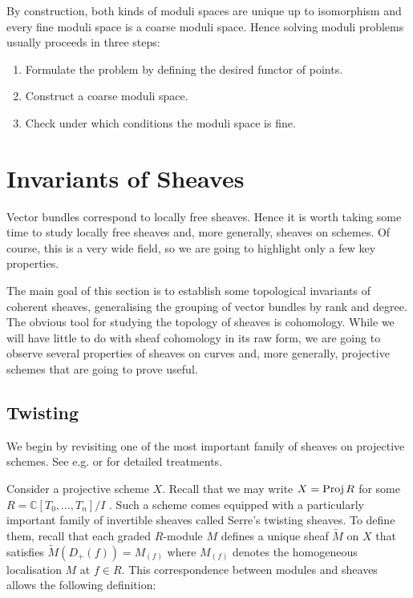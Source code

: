 \documentclass[12pt]{ociamthesis}  %
\begin{document}
By construction, both kinds of moduli spaces are unique up to
isomorphism and every fine moduli space is a coarse moduli
space. Hence solving moduli problems usually proceeds in
three steps:

\begin{enumerate}
  \item Formulate the problem by defining the desired functor of
        points.
  \item Construct a coarse moduli space.
  \item Check under which conditions the moduli space is fine.
\end{enumerate}

\section{Invariants of Sheaves}

Vector bundles correspond to locally free sheaves. Hence it is worth
taking some time to study locally free sheaves and, more generally,
sheaves on schemes. Of course, this is a very wide field,
so we are going to highlight only a few key properties.

The main goal of this section is to establish some topological
invariants of coherent sheaves, generalising the grouping of
vector bundles by rank and degree. The obvious tool for studying
the topology of sheaves is cohomology. While we will have little
to do with sheaf cohomology in its raw form, we are going to
observe several properties of sheaves on curves and, more generally,
projective schemes that are going to prove useful.

\subsection{Twisting}

We begin by revisiting one of the most important family of sheaves
on projective schemes. See e.g. \cite{gortz2010} or
\cite{hartshorne1977} for detailed treatments.

Consider a projective scheme $X$. Recall that we may write
$X=\operatorname{Proj} R$ for some $R=\mathbb{C}[T_0,\ldots,T_n]/I$ \cite[II Corollary 5.16]{hartshorne1977}. Such a scheme comes
equipped with a particularly important family of invertible sheaves
called Serre's twisting sheaves. To define them, recall that each
graded $R$-module $M$ defines a unique sheaf $\tilde M$ on $X$
that satisfies $\tilde M (D_+(f)) = M_{(f)}$ where $M_{(f)}$
denotes the homogeneous localisation $M$ at $f\in R$. This
correspondence between modules and sheaves allows the following
definition:
\end{document}
